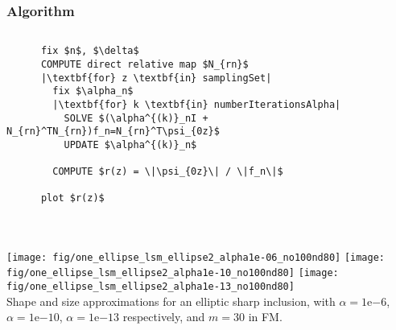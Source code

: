 \documentclass[10pt]{beamer}
\newcommand*{\xMin}{0}%
\newcommand*{\xMax}{6}%
\newcommand*{\yMin}{0}%
\newcommand*{\yMax}{6}%
\theoremstyle{plain}
\theoremstyle{plain}
\renewcommand{\i}{\textup{i}}
\begin{document}
\begin{frame}[fragile]
 \frametitle{Algorithm}
  \begin{columns}[T]
    \begin{column}{0.5\textwidth}
    \footnotesize
     \begin{lstlisting}
      fix $n$, $\delta$
      COMPUTE direct relative map $N_{rn}$
      |\textbf{for} z \textbf{in} samplingSet|
        fix $\alpha_n$
        |\textbf{for} k \textbf{in} numberIterationsAlpha|
          SOLVE $(\alpha^{(k)}_nI + N_{rn}^TN_{rn})f_n=N_{rn}^T\psi_{0z}$
          UPDATE $\alpha^{(k)}_n$
          
        COMPUTE $r(z) = \|\psi_{0z}\| / \|f_n\|$
        
      plot $r(z)$
      
     \end{lstlisting}

     

    \end{column}
  \begin{column}{0.5\textwidth}
  \begin{center}
\end{center}
\end{column}
\end{columns}
\end{frame}
\begin{frame}
 \frametitle{}
{
\texttt{[image: fig/one\_ellipse\_lsm\_ellipse2\_alpha1e-06\_no100nd80]}
}
{
\texttt{[image: fig/one\_ellipse\_lsm\_ellipse2\_alpha1e-10\_no100nd80]}
}
{
\texttt{[image: fig/one\_ellipse\_lsm\_ellipse2\_alpha1e-13\_no100nd80]}
}
\\
Shape and size approximations for an elliptic sharp inclusion, with $\alpha=\mathrm{1e}{-6}$, 
$\alpha=\mathrm{1e}{-10}$, $\alpha=\mathrm{1e}{-13}$ respectively, and $m=30$ in FM.

\end{frame}
\end{document}
